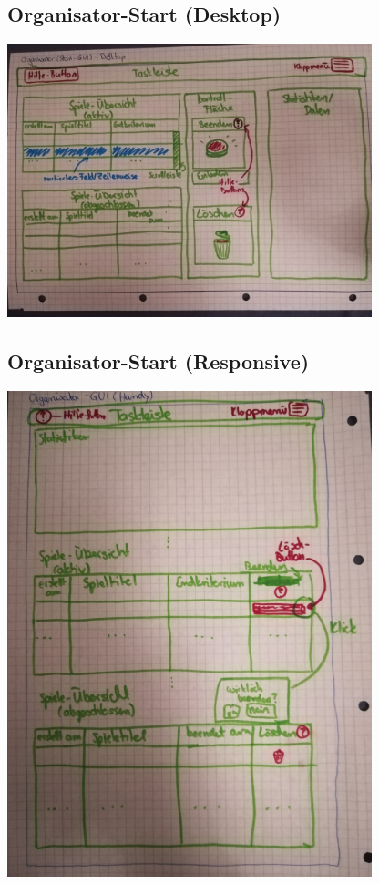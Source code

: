 \documentclass[a4paper]{scrreprt}
\begin{document}
    \subsection{Organisator-Start (Desktop)}
    \centering
    \includegraphics[width=400px]{../pictures/2_Organisator.jpg}

    \subsection{Organisator-Start (Responsive)}
    \centering
    \includegraphics[width=400px]{../pictures/3_Organisator(responsive).jpg}
\end{document}
